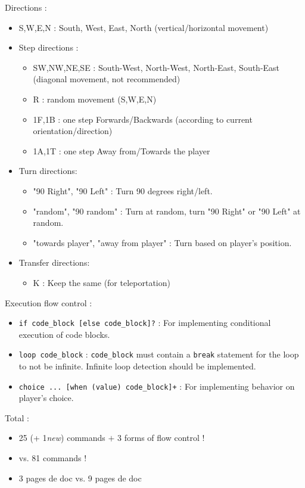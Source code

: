 \documentclass[11pt]{article}
\begin{document}
\newpage
Directions :
\begin{itemize}
	\item S,W,E,N : South, West, East, North (vertical/horizontal movement)
	
	\item Step directions :
	\begin{itemize}
		\item SW,NW,NE,SE : South-West, North-West, North-East, South-East (diagonal movement, not recommended)
		\item R : random movement (S,W,E,N)
		\item 1F,1B : one step Forwards/Backwards (according to current orientation/direction)
		\item 1A,1T : one step Away from/Towards the player
	\end{itemize}

	\item Turn directions:
	\begin{itemize}
		\item "90 Right", "90 Left" : Turn 90 degrees right/left.
		\item "random", "90 random" : Turn at random, turn "90 Right" or "90 Left" at random.
		\item "towards player", "away from player" : Turn based on player's position.
	\end{itemize}

	\item Transfer directions:
	\begin{itemize}
		\item K : Keep the same (for teleportation)
	\end{itemize}	
\end{itemize}


Execution flow control :
\begin{itemize}
	\item \verb|if code_block [else code_block]?| : For implementing conditional execution of code blocks.
	\item \verb|loop code_block| : \verb|code_block| must contain a \verb|break| statement for the loop to not be infinite. Infinite loop detection should be implemented.
	\item \verb|choice ... [when (value) code_block]+| : For implementing behavior on player's choice.
\end{itemize}

Total : 
\begin{itemize}
	\item 25 (+ 1\textit{new}) commands $+$ 3 forms of flow control !
	\item vs. 81 commands !
	\item 3 pages de doc vs. 9 pages de doc
\end{itemize}
\end{document}
